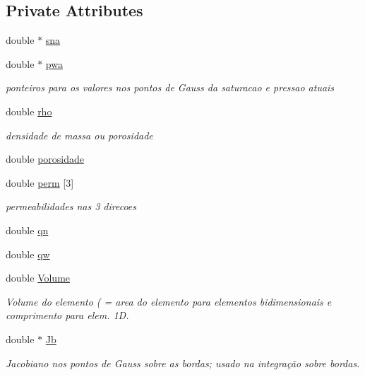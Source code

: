 \subsection*{Private Attributes}
\begin{DoxyCompactItemize}
\item 
double $\ast$ \hyperlink{classDG__Elem_ac036921322e2a7d3648723ae77592af5}{sna}
\item 
double $\ast$ \hyperlink{classDG__Elem_afc53954789d7ec74b2cf2eb2be590d16}{pwa}
\begin{DoxyCompactList}\small\item\em ponteiros para os valores nos pontos de Gauss da saturacao e pressao atuais \end{DoxyCompactList}\item 
double \hyperlink{classDG__Elem_a56be853c8e67f9ee71f6b07aa99b3a58}{rho}
\begin{DoxyCompactList}\small\item\em densidade de massa ou porosidade \end{DoxyCompactList}\item 
double \hyperlink{classDG__Elem_a0bb64698c7f238bf48da2d584965fcd0}{porosidade}
\item 
double \hyperlink{classDG__Elem_a4b1a31424c3c115bc5bb964c3b72be66}{perm} \mbox{[}3\mbox{]}
\begin{DoxyCompactList}\small\item\em permeabilidades nas 3 direcoes \end{DoxyCompactList}\item 
double \hyperlink{classDG__Elem_a769560386db7e7c3b64d440ed84156be}{qn}
\item 
double \hyperlink{classDG__Elem_a89d2130d5e677207cb6c962dc90f79b3}{qw}
\item 
double \hyperlink{classDG__Elem_aeb8874934ea534afbee1017456e54051}{Volume}
\begin{DoxyCompactList}\small\item\em Volume do elemento ( = area do elemento para elementos bidimensionais e comprimento para elem. 1D. \end{DoxyCompactList}\item 
double $\ast$ \hyperlink{classDG__Elem_a21966ef258f170053e616e17082516c8}{Jb}
\begin{DoxyCompactList}\small\item\em Jacobiano nos pontos de Gauss sobre as bordas; usado na integração sobre bordas. \end{DoxyCompactList}\item 

\end{DoxyCompactItemize}
